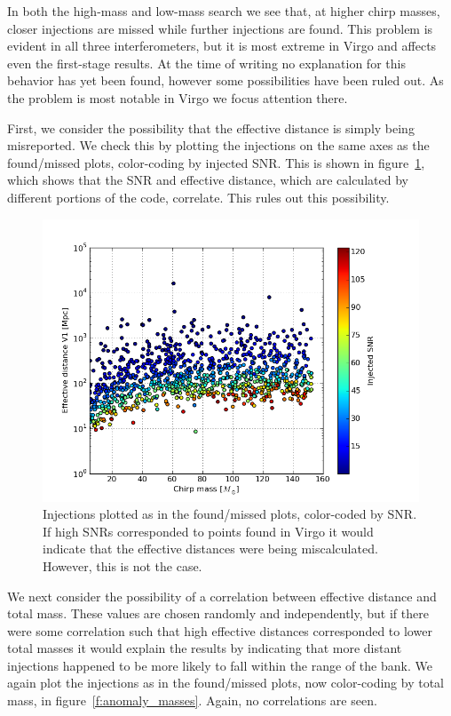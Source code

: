 In both the high-mass and low-mass search we see that, at higher chirp
masses, closer injections are missed while further injections are
found.  This problem is evident in all three interferometers, but 
it is most extreme in Virgo and affects even the first-stage results.
At the time of writing no explanation for this behavior has
yet been found, however some possibilities have been ruled out.  As
the problem is most notable in Virgo we focus attention there.

First, we consider the possibility that the effective distance is
simply being misreported.  We check this by plotting the injections on
the same axes as the found/missed plots, color-coding by injected SNR.
This is shown in figure~\ref{f:anomaly_snrs}, which shows that the SNR
and effective distance, which are calculated by different portions of
the code, correlate.  This rules out this possibility.

\begin{figure}
  \includegraphics[width=\linewidth]{figures/ninja2_results/anomaly_snrs}
  \caption[Injections color-coded by SNR]{
  \label{f:anomaly_snrs}
Injections plotted as in the found/missed plots, color-coded by SNR.
If high SNRs corresponded to points found in Virgo it would indicate
that the effective distances were being miscalculated.  However, this
is not the case.
}
\end{figure}%

We next consider the possibility of a correlation between effective
distance and total mass.  These values are chosen randomly and
independently, but if there were some correlation such that high
effective distances corresponded to lower total masses it would
explain the results by indicating that more distant injections
happened to be more likely to fall within the range of the bank.
We again plot the injections as in the found/missed plots, now
color-coding by total mass, in figure~\ref{f:anomaly_masses}.  Again,
no correlations are seen.



